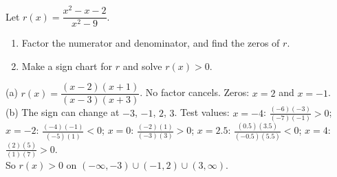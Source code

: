 \begin{exo}{}
Let $r(x)=\dfrac{x^2-x-2}{x^2-9}$.
\begin{enumerate}[label=(\alph*)]
\item Factor the numerator and denominator, and find the zeros of $r$.
\item Make a sign chart for $r$ and solve $r(x)>0$.
\end{enumerate}
\begin{solution}
(a) $r(x)=\dfrac{(x-2)(x+1)}{(x-3)(x+3)}$. No factor cancels. Zeros: $x=2$ and $x=-1$.\\
(b) The sign can change at $-3$, $-1$, $2$, $3$. Test values: $x=-4$: $\frac{(-6)(-3)}{(-7)(-1)}>0$; $x=-2$: $\frac{(-4)(-1)}{(-5)(1)}<0$; $x=0$: $\frac{(-2)(1)}{(-3)(3)}>0$; $x=2.5$: $\frac{(0.5)(3.5)}{(-0.5)(5.5)}<0$; $x=4$: $\frac{(2)(5)}{(1)(7)}>0$.\\
So $r(x)>0$ on $(-\infty,-3)\cup(-1,2)\cup(3,\infty)$.
\end{solution}
\end{exo}


